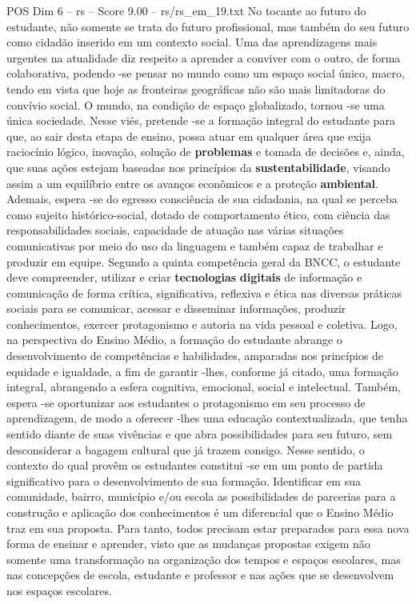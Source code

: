 \begin{textsample}{POS Dim 6 – rs – Score 9.00 – rs/rs\_em\_19.txt}
No tocante ao futuro do estudante, não somente se trata do futuro profissional, mas também do seu futuro como cidadão inserido em um contexto social.
Uma das aprendizagens mais urgentes na atualidade diz respeito a aprender a conviver com o outro, de forma colaborativa, podendo -se pensar no mundo como um espaço social único, macro, tendo em vista que hoje as fronteiras geográficas não são mais limitadoras do convívio social.
O mundo, na condição de espaço globalizado, tornou -se uma única sociedade.
Nesse viés, pretende -se a formação integral do estudante para que, ao sair desta etapa de ensino, possa atuar em qualquer área que exija raciocínio lógico, inovação, solução de \textbf{problemas} e tomada de decisões e, ainda, que suas ações estejam baseadas nos princípios da \textbf{sustentabilidade}, visando assim a um equilíbrio entre os avanços econômicos e a proteção \textbf{ambiental}.
Ademais, espera -se do egresso consciência de sua cidadania, na qual se perceba como sujeito histórico-social, dotado de comportamento ético, com ciência das responsabilidades sociais, capacidade de atuação nas várias situações comunicativas por meio do uso da linguagem e também capaz de trabalhar e produzir em equipe.
Segundo a quinta competência geral da BNCC, o estudante deve compreender, utilizar e criar \textbf{tecnologias} \textbf{digitais} de informação e comunicação de forma crítica, significativa, reflexiva e ética nas diversas práticas sociais para se comunicar, acessar e disseminar informações, produzir conhecimentos, exercer protagonismo e autoria na vida pessoal e coletiva.
Logo, na perspectiva do Ensino Médio, a formação do estudante abrange o desenvolvimento de competências e habilidades, amparadas nos princípios de equidade e igualdade, a fim de garantir -lhes, conforme já citado, uma formação integral, abrangendo a esfera cognitiva, emocional, social e intelectual.
Também, espera -se oportunizar aos estudantes o protagonismo em seu processo de aprendizagem, de modo a oferecer -lhes uma educação contextualizada, que tenha sentido diante de suas vivências e que abra possibilidades para seu futuro, sem desconsiderar a bagagem cultural que já trazem consigo.
Nesse sentido, o contexto do qual provêm os estudantes constitui -se em um ponto de partida significativo para o desenvolvimento de sua formação.
Identificar em sua comunidade, bairro, município e/ou escola as possibilidades de parcerias para a construção e aplicação dos conhecimentos é um diferencial que o Ensino Médio traz em sua proposta.
Para tanto, todos precisam estar preparados para essa nova forma de ensinar e aprender, visto que as mudanças propostas exigem não somente uma transformação na organização dos tempos e espaços escolares, mas nas concepções de escola, estudante e professor e nas ações que se desenvolvem nos espaços escolares.

\end{textsample}
